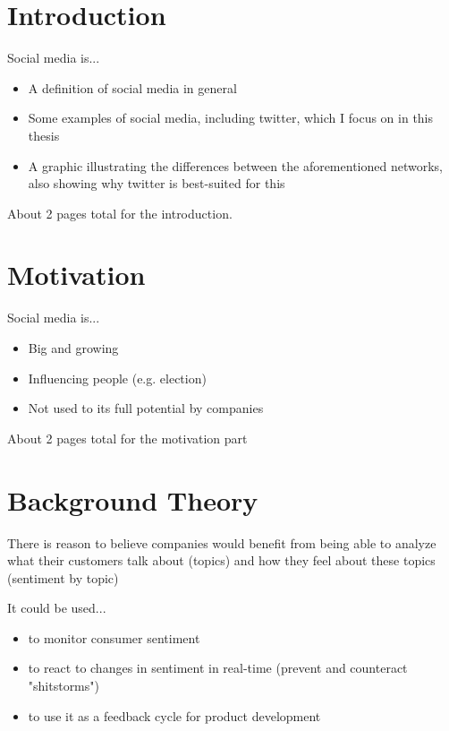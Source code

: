 \chapter{Introduction}

\label{ch:introduction}

Social media is...

\begin{itemize}
    \item
    A definition of social media in general
    \item
    Some examples of social media, including twitter, which I focus on in this thesis
    \item
    A graphic illustrating the differences between the aforementioned networks, also showing why twitter is best-suited for this
\end{itemize}

About 2 pages total for the introduction.

\pagebreak[2]

\chapter{Motivation}

\label{ch:motivation}

Social media is...

\begin{itemize}
    \item
    Big and growing
    \item
    Influencing people (e.g. election)
    \item
    Not used to its full potential by companies
\end{itemize}

About 2 pages total for the motivation part

\pagebreak[2]

\chapter{Background Theory}

\label{ch:backgroundTheory}

There is reason to believe companies would benefit from being able to analyze what their customers talk about (topics) and how they feel about these topics (sentiment by topic)

It could be used...
\begin{itemize}
    \item
    to monitor consumer sentiment
    \item
    to react to changes in sentiment in real-time (prevent and counteract "shitstorms")
    \item
    to use it as a feedback cycle for product development
\end{itemize}

